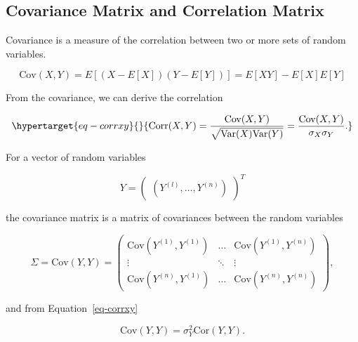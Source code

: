 \documentclass[
  letterpaper,
  DIV=11,
  numbers=noendperiod]{scrreprt}
\begin{document}
\hypertarget{covariance-matrix-and-correlation-matrix}{%
\subsection{Covariance Matrix and Correlation
Matrix}\label{covariance-matrix-and-correlation-matrix}}

\begin{tcolorbox}[enhanced jigsaw, arc=.35mm, colback=white, bottomtitle=1mm, toprule=.15mm, coltitle=black, titlerule=0mm, leftrule=.75mm, title=\textcolor{quarto-callout-note-color}{\faInfo}\hspace{0.5em}{Covariance and Correlation (taken from @Forr08a)}, opacitybacktitle=0.6, breakable, colbacktitle=quarto-callout-note-color!10!white, opacityback=0, toptitle=1mm, rightrule=.15mm, left=2mm, colframe=quarto-callout-note-color-frame, bottomrule=.15mm]

Covariance is a measure of the correlation between two or more sets of
random variables.

\[
\text{Cov}(X,Y) = E[(X - E[X])(Y - E[Y])] = E[XY] - E[X]E[Y]
\]

From the covariance, we can derive the correlation

\begin{equation}\protect\hypertarget{eq-corrxy}{}{
\text{Corr}(X,Y) = \frac{\text{Cov}(X,Y)}{\sqrt{\text{Var}(X)\text{Var}(Y)}} = \frac{\text{Cov}(X,Y)}{\sigma_X\sigma_Y}.
}\label{eq-corrxy}\end{equation}

For a vector of random variables

\[
Y = 
\begin{pmatrix}
(Y^{(l)}, \ldots, Y^{(n)})
\end{pmatrix}^T
\]

the covariance matrix is a matrix of covariances between the random
variables

\[
\Sigma =
\text{Cov}(Y, Y) =
\begin{pmatrix}
\text{Cov}(Y^{(1)}, Y^{(1)}) & \ldots & \text{Cov}(Y^{(1)}, Y^{(n)}) \\
\vdots & \ddots & \vdots \\
\text{Cov}(Y^{(n)}, Y^{(1)}) & \ldots & \text{Cov}(Y^{(n)}, Y^{(n)})
\end{pmatrix},
\]

and from Equation~\ref{eq-corrxy}

\[
\text{Cov}(Y, Y) = \sigma_Y^2 \text{Cor}(Y, Y).
\]

\end{tcolorbox}
\end{document}
